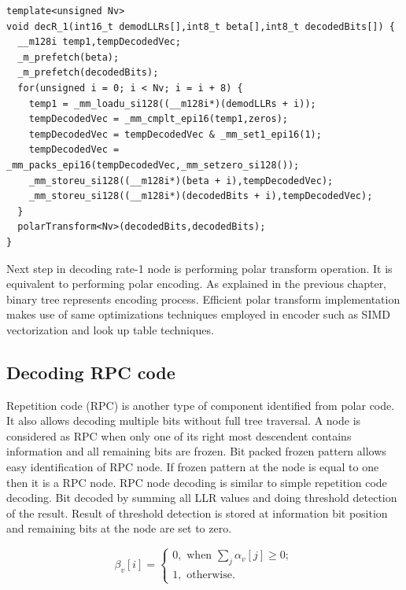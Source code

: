 \begin{code}
	\label{code:rateOneNodeDecoding}
	\begin{verbatim}
template<unsigned Nv>
void decR_1(int16_t demodLLRs[],int8_t beta[],int8_t decodedBits[]) {
  __m128i temp1,tempDecodedVec;
  _m_prefetch(beta);
  _m_prefetch(decodedBits);
  for(unsigned i = 0; i < Nv; i = i + 8) {
    temp1 = _mm_loadu_si128((__m128i*)(demodLLRs + i));
    tempDecodedVec = _mm_cmplt_epi16(temp1,zeros);
    tempDecodedVec = tempDecodedVec & _mm_set1_epi16(1);
    tempDecodedVec = _mm_packs_epi16(tempDecodedVec,_mm_setzero_si128());
    _mm_storeu_si128((__m128i*)(beta + i),tempDecodedVec);
    _mm_storeu_si128((__m128i*)(decodedBits + i),tempDecodedVec);
  }
  polarTransform<Nv>(decodedBits,decodedBits);
}
\end{verbatim}
\end{code}

Next step in decoding rate-1 node is performing polar transform operation. It is equivalent to performing polar encoding. As explained in the previous chapter, binary tree represents encoding process. Efficient polar transform implementation makes use of same optimizations techniques employed in encoder such as SIMD vectorization and look up table techniques.

\subsection{Decoding RPC code}
Repetition code (RPC) is another type of component identified from polar code. It also allows decoding multiple bits without full tree traversal. A node is considered as RPC when only one of its right most descendent contains information and all remaining bits are frozen. Bit packed frozen pattern allows easy identification of RPC node. If frozen pattern at the node is equal to one then it is a RPC node. RPC node decoding is similar to simple repetition code decoding. Bit decoded by summing all LLR values and doing threshold detection of the result.  Result of threshold detection is stored at information bit position and remaining bits at the node are set to zero.

\begin{equation*}
 \beta_{v}[i] = \begin{cases}
				0, \text{ when $\sum_{j} \alpha_{v}[j] \geq 0 ;$}  \\
				1, \text{ otherwise.}
				\end{cases}
\end{equation*}


